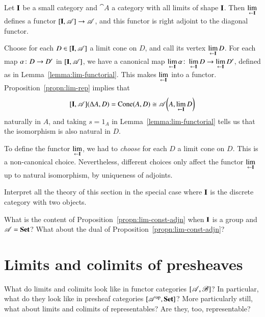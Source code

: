 \begin{propn}
\label{propn:lim-const-adjn}
%
%
Let $\mathbf{I}$ be a small category and $\cat{A}$ a category with all limits of
shape $\mathbf{I}$.  Then $\lim\limits_{\leftarrow \mathbf{I}}$ defines a functor
$[\mathbf{I},\mathscr{A}] \to \mathscr{A}$, and this functor is right adjoint
to the diagonal functor.
\end{propn}

\begin{pf}
Choose for each $D \in [\mathbf{I},\mathscr{A}]$ a limit cone on $D$, and
call its vertex $\lim\limits_{\leftarrow \mathbf{I}} D$.  For each map $\alpha\from D \to D'$ in
$[\mathbf{I},\mathscr{A}]$, we have a canonical map
$\lt{\scat{I}} \alpha \from \lt{\scat{I}} D \to \lt{\scat{I}} D'$,
defined as in
Lemma~\ref{lemma:lim-functorial}.  This
makes $\lim\limits_{\leftarrow \mathbf{I}}$ into a functor.  Proposition~\ref{propn:lim-rep}
implies that
\[
[\mathbf{I},\mathscr{A}](\Delta A, D)
=
\operatorname{Cone}(A, D)
\cong
\mathscr{A}\biggl(A, \lim\limits_{\leftarrow \mathbf{I}} D\biggr)
\]
naturally in $A$, and taking $s = 1_A$ in
Lemma~\ref{lemma:lim-functorial} tells
us that the isomorphism is also natural in $D$.
\end{pf}

To define the functor $\lim\limits_{\leftarrow \mathbf{I}}$, we had to \emph{choose}%
%
%
for each $D$ a limit cone on $D$.  This is a non-canonical choice.
Nevertheless, different choices only affect the functor $\lim\limits_{\leftarrow \mathbf{I}}$ up
to natural isomorphism, by uniqueness of adjoints.


\exs


\begin{question}
Interpret all the theory of this section in the special case where
$\mathbf{I}$ is the discrete category with two objects.
\end{question}


\begin{question}
What is the content of Proposition~\ref{propn:lim-const-adjn} when
$\mathbf{I}$ is a group and $\mathscr{A} = \mathbf{Set}$?  What about the dual of
Proposition~\ref{propn:lim-const-adjn}?
\end{question}



\section{Limits and colimits of presheaves}
\label{sec:lim-pshf}


What do limits and colimits look like in functor categories
$[\mathscr{A},\mathscr{B}]$?  In particular, what do they look like in
presheaf categories $[\mathscr{A}^{\mathrm{op}},\mathbf{Set}]$?  More particularly still,
what about limits and colimits of representables?  Are they, too,
representable?

